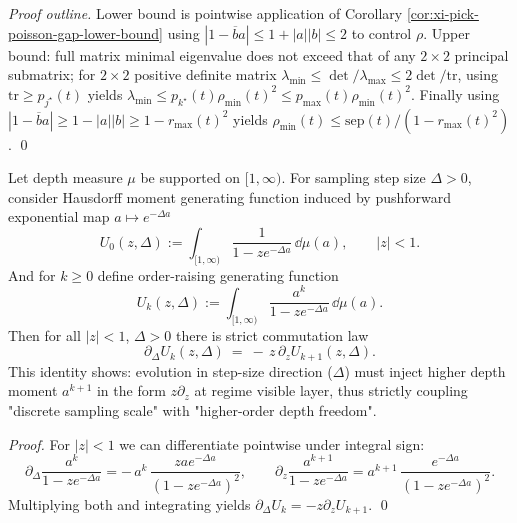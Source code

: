 \begin{proof}[Proof outline]
Lower bound is pointwise application of Corollary \ref{cor:xi-pick-poisson-gap-lower-bound} using \(|1-\overline b a|\le 1+|a||b|\le 2\) to control \(\rho\).
Upper bound: full matrix minimal eigenvalue does not exceed that of any \(2\times 2\) principal submatrix; for \(2\times 2\) positive definite matrix \(\lambda_{\min}\le \det/\lambda_{\max}\le 2\det/\mathrm{tr}\), using \(\mathrm{tr}\ge p_{j^\star}(t)\) yields \(\lambda_{\min}\le p_{k^\star}(t)\rho_{\min}(t)^2\le p_{\max}(t)\rho_{\min}(t)^2\).
Finally using \(|1-\overline b a|\ge 1-|a||b|\ge 1-r_{\max}(t)^2\) yields \(\rho_{\min}(t)\le \mathrm{sep}(t)/(1-r_{\max}(t)^2)\). \qed
\end{proof}

\begin{proposition}\label{prop:xi-delta-flow-moment-ladder-commutation}
Let depth measure \(\mu\) be supported on \([1,\infty)\).
For sampling step size \(\Delta>0\), consider Hausdorff moment generating function induced by pushforward exponential map \(a\mapsto e^{-\Delta a}\)
\[
U_0(z,\Delta):=\int_{[1,\infty)}\frac{1}{1-ze^{-\Delta a}}\,\dd\mu(a),\qquad |z|<1.
\]
And for \(k\ge 0\) define order-raising generating function
\[
U_k(z,\Delta):=\int_{[1,\infty)}\frac{a^k}{1-ze^{-\Delta a}}\,\dd\mu(a).
\]
Then for all \(|z|<1\), \(\Delta>0\) there is strict commutation law
\[
\boxed{\;
\partial_\Delta U_k(z,\Delta)\ =\ -\,z\,\partial_z U_{k+1}(z,\Delta).\;}
\]
This identity shows: evolution in step-size direction (\(\Delta\)) must inject higher depth moment \(a^{k+1}\) in the form \(z\partial_z\) at regime visible layer, thus strictly coupling "discrete sampling scale" with "higher-order depth freedom".
\end{proposition}
\begin{proof}
For \(|z|<1\) we can differentiate pointwise under integral sign:
\[
\partial_\Delta\frac{a^k}{1-ze^{-\Delta a}}
=-\,a^k\,\frac{zae^{-\Delta a}}{(1-ze^{-\Delta a})^2},
\qquad
\partial_z\frac{a^{k+1}}{1-ze^{-\Delta a}}
=a^{k+1}\,\frac{e^{-\Delta a}}{(1-ze^{-\Delta a})^2}.
\]
Multiplying both and integrating yields \(\partial_\Delta U_k=-z\partial_z U_{k+1}\). \qed
\end{proof}

